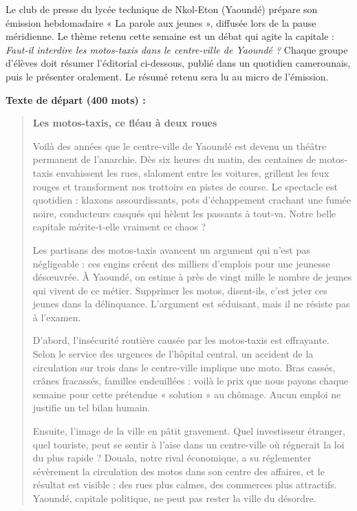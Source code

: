 \documentclass[11pt]{article}
\newcounter{popsec}
\newcounter{popsub}
\newcommand{\courssub}[1]{%
  \stepcounter{popsub}%
  \par\vspace{9pt}\noindent{\popxbold\fontsize{11.5}{13}\selectfont\color{popink}{\color{poporange}\thepopsec.\thepopsub}\hspace{6pt}#1}\par\nopagebreak\vspace{4pt}
}
\begin{document}
\courssub{Situation}

Le club de presse du lycée technique de Nkol-Eton (Yaoundé) prépare son émission hebdomadaire « La parole aux jeunes », diffusée lors de la pause méridienne. Le thème retenu cette semaine est un débat qui agite la capitale : \emph{Faut-il interdire les motos-taxis dans le centre-ville de Yaoundé ?} Chaque groupe d'élèves doit résumer l'éditorial ci-dessous, publié dans un quotidien camerounais, puis le présenter oralement. Le résumé retenu sera lu au micro de l'émission.

\textbf{Texte de départ (400 mots) :}

\begin{quote}
\textbf{Les motos-taxis, ce fléau à deux roues}

Voilà des années que le centre-ville de Yaoundé est devenu un théâtre permanent de l'anarchie. Dès six heures du matin, des centaines de motos-taxis envahissent les rues, slaloment entre les voitures, grillent les feux rouges et transforment nos trottoirs en pistes de course. Le spectacle est quotidien : klaxons assourdissants, pots d'échappement crachant une fumée noire, conducteurs casqués qui hèlent les passants à tout-va. Notre belle capitale mérite-t-elle vraiment ce chaos ?

Les partisans des motos-taxis avancent un argument qui n'est pas négligeable : ces engins créent des milliers d'emplois pour une jeunesse désœuvrée. À Yaoundé, on estime à près de vingt mille le nombre de jeunes qui vivent de ce métier. Supprimer les motos, disent-ils, c'est jeter ces jeunes dans la délinquance. L'argument est séduisant, mais il ne résiste pas à l'examen.

D'abord, l'insécurité routière causée par les motos-taxis est effrayante. Selon le service des urgences de l'hôpital central, un accident de la circulation sur trois dans le centre-ville implique une moto. Bras cassés, crânes fracassés, familles endeuillées : voilà le prix que nous payons chaque semaine pour cette prétendue « solution » au chômage. Aucun emploi ne justifie un tel bilan humain.

Ensuite, l'image de la ville en pâtit gravement. Quel investisseur étranger, quel touriste, peut se sentir à l'aise dans un centre-ville où régnerait la loi du plus rapide ? Douala, notre rival économique, a su réglementer sévèrement la circulation des motos dans son centre des affaires, et le résultat est visible : des rues plus calmes, des commerces plus attractifs. Yaoundé, capitale politique, ne peut pas rester la ville du désordre.


\end{quote}
\end{document}
